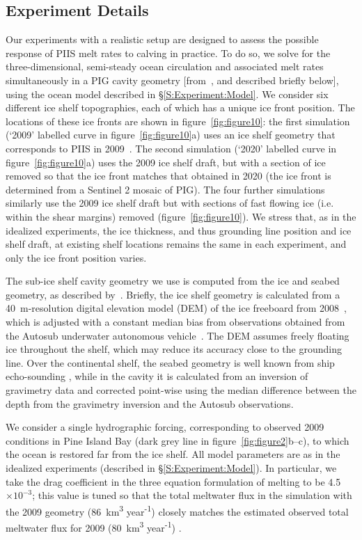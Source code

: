 \documentclass[draft]{agujournal2019}
\begin{document}
\subsection{Experiment Details}
Our experiments with a realistic setup are designed to assess the possible response of PIIS melt rates to calving in practice. To do so, we solve for the three-dimensional, semi-steady ocean circulation and associated melt rates simultaneously in a PIG cavity geometry [from~, and described briefly below], using the ocean model described in \S\ref{S:Experiment:Model}. We consider six different ice shelf topographies, each of which has a unique ice front position. The locations of these ice fronts are shown in figure~\ref{fig:figure10}: the first simulation (`2009' labelled curve in figure~\ref{fig:figure10}a) uses an ice shelf geometry that corresponds to PIIS in 2009~\cite{Dutrieux2014Science}. The second simulation (`2020' labelled curve in figure~\ref{fig:figure10}a) uses the 2009 ice shelf draft, but with a section of ice removed so that the ice front matches that obtained in 2020 (the ice front is determined from a Sentinel 2 mosaic of PIG). The four further simulations similarly use the 2009 ice shelf draft but with sections of fast flowing ice (i.e. within the shear margins) removed (figure~\ref{fig:figure10}). We stress that, as in the idealized experiments, the ice thickness, and thus grounding line position and ice shelf draft, at existing shelf locations remains the same in each experiment, and only the ice front position varies.

The sub-ice shelf cavity geometry we use is computed from the ice and seabed geometry, as described by~. Briefly, the ice shelf geometry is calculated from a 40~m-resolution digital elevation model (DEM) of the ice freeboard from 2008~\cite{Korona2009Photogrammetry}, which is adjusted with a constant median bias from observations obtained from the Autosub underwater autonomous vehicle~\cite{Jenkins2010NatureGeo}. The DEM assumes freely floating ice throughout the shelf, which may reduce its accuracy close to the grounding line. Over the continental shelf, the seabed geometry is well known from ship echo-sounding \cite{Dutrieux2014Science}, while in the cavity it is calculated from an inversion of gravimetry data and corrected point-wise using the median difference between the depth from the gravimetry inversion and the Autosub observations.

We consider a single hydrographic forcing, corresponding to observed 2009 conditions in Pine Island Bay (dark grey line in figure~\ref{fig:figure2}b--c), to which the ocean is restored far from the ice shelf. All model parameters are as in the idealized experiments (described in \S\ref{S:Experiment:Model}). In particular, we take the drag coefficient in the three equation formulation of melting to be 4.5$\times10^{-3}$; this value is tuned so that the total meltwater flux in the simulation with the 2009 geometry (86~km\textsuperscript{3} year\textsuperscript{-1}) closely matches the estimated observed total meltwater flux for 2009 (80~km\textsuperscript{3} year\textsuperscript{-1}) \cite{Dutrieux2014Science}.
\end{document}
